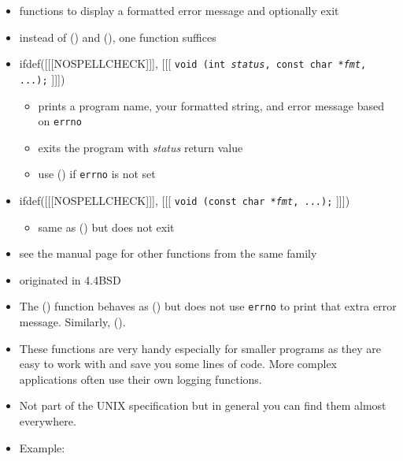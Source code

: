 \begin{slide}
\setlength{\baselineskip}{0.8\baselineskip}
\begin{itemize}
\item functions to display a formatted error message and optionally exit
\item instead of () and (), one function suffices
\item
ifdef([[[NOSPELLCHECK]]], [[[
\texttt{void (int \emph{status}, const char *\emph{fmt}, ...);}
]]])
\begin{itemize}
\item prints a program name, your formatted string, and error message based on
\texttt{errno}
\item exits the program with \emph{status} return value
\item use () if \texttt{errno} is not set
\end{itemize}
\item
ifdef([[[NOSPELLCHECK]]], [[[
\texttt{void (const char *\emph{fmt}, ...);}
]]])
\begin{itemize}
\item same as () but does not exit
\end{itemize}
\item see the manual page for other functions from the same family
\item originated in 4.4BSD
\end{itemize}
\end{slide}


\begin{itemize}
\item The () function behaves as () but does not use
\texttt{errno} to print that extra error message.  Similarly, ().
\item These functions are very handy especially for smaller programs as they are
easy to work with and save you some lines of code.  More complex
app\-li\-ca\-tions often use their own logging functions.
\item Not part of the UNIX specification but in general you can find them almost
everywhere.
\item Example: 
\end{itemize}

\endinput
